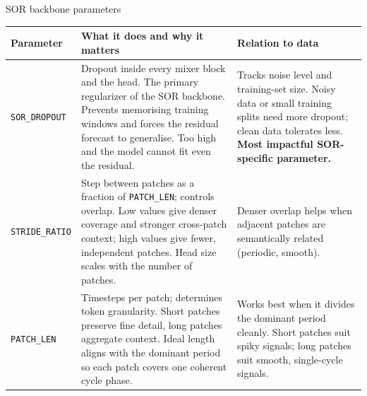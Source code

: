 \documentclass[aspectratio=169]{beamer}
\begin{document}
\begin{frame}{SOR backbone parameters}
\scriptsize
\setlength{\tabcolsep}{5pt}
\renewcommand{\arraystretch}{1.1}
\begin{tabular}{@{}L{2.1cm} L{5.6cm} L{5.6cm}@{}}
  \toprule
  \textbf{Parameter} & \textbf{What it does and why it matters}
                     & \textbf{Relation to data} \\
  \midrule
  \texttt{SOR\_DROPOUT}
    & Dropout inside every mixer block and the head. The primary
      regularizer of the SOR backbone. Prevents memorising training
      windows and forces the residual forecast to generalise. Too
      high and the model cannot fit even the residual.
    & Tracks noise level and training-set size. Noisy data or small
      training splits need more dropout; clean data tolerates less.
      \textbf{Most impactful SOR-specific parameter.} \\
  \addlinespace
  \texttt{STRIDE\_RATIO}
    & Step between patches as a fraction of \texttt{PATCH\_LEN};
      controls overlap. Low values give denser coverage and stronger
      cross-patch context; high values give fewer, independent
      patches. Head size scales with the number of patches.
    & Denser overlap helps when adjacent patches are semantically
      related (periodic, smooth). \\
  \addlinespace
  \texttt{PATCH\_LEN}
    & Timesteps per patch; determines token granularity. Short
      patches preserve fine detail, long patches aggregate context.
      Ideal length aligns with the dominant period so each patch
      covers one coherent cycle phase.
    & Works best when it divides the dominant period cleanly. Short
      patches suit spiky signals; long patches suit smooth,
      single-cycle signals. \\
  \bottomrule
\end{tabular}
\end{frame}

\end{document}
